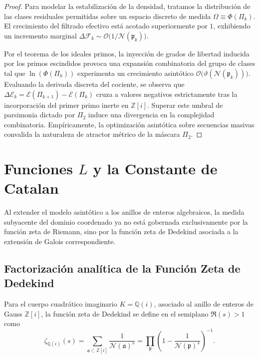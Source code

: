 \documentclass{article}
\numberwithin{equation}{section}
\theoremstyle{plain}
\theoremstyle{definition}
\begin{document}
\begin{proof}
Para modelar la estabilización de la densidad, tratamos la distribución de las clases residuales permitidas sobre un espacio discreto de medida $\Omega \equiv \Phi(\Pi_k)$. El crecimiento del filtrado efectivo está acotado superiormente por $1$, exhibiendo un incremento marginal $\Delta\mathcal{F}_k \sim \mathcal{O}\big(1/\mathcal{N}(\mathfrak{p}_k)\big)$.

Por el teorema de los ideales primos, la inyección de grados de libertad inducida por los primos escindidos provoca una expansión combinatoria del grupo de clases tal que $\ln(\Phi(\Pi_k))$ experimenta un crecimiento asintótico $\mathcal{O}\big(\vartheta(\mathcal{N}(\mathfrak{p}_k))\big)$. Evaluando la derivada discreta del cociente, se observa que $\Delta\mathcal{E}_k = \mathcal{E}(\Pi_{k+1}) - \mathcal{E}(\Pi_k)$ cruza a valores negativos estrictamente tras la incorporación del primer primo inerte en $\mathbb{Z}[i]$. Superar este umbral de parsimonia dictado por $\Pi_2$ induce una divergencia en la complejidad combinatoria. Empíricamente, la optimización asintótica sobre secuencias masivas convalida la naturaleza de atractor métrico de la máscara $\Pi_2$.
\end{proof}

\section{Funciones \texorpdfstring{$L$}{L} y la Constante de Catalan}
\label{sec:funciones_L}

Al extender el modelo asintótico a los anillos de enteros algebraicos, la medida subyacente del dominio coordenado ya no está gobernada exclusivamente por la función zeta de Riemann, sino por la función zeta de Dedekind asociada a la extensión de Galois correspondiente.

\subsection{Factorización analítica de la Función Zeta de Dedekind}

Para el cuerpo cuadrático imaginario $K = \mathbb{Q}(i)$, asociado al anillo de enteros de Gauss $\mathbb{Z}[i]$, la función zeta de Dedekind se define en el semiplano $\Re(s) > 1$ como
\begin{equation}
    \zeta_{\mathbb{Q}(i)}(s) = \sum_{\mathfrak{a} \subset \mathbb{Z}[i]} \frac{1}{\mathcal{N}(\mathfrak{a})^s} = \prod_{\mathfrak{p}} \left( 1 - \frac{1}{\mathcal{N}(\mathfrak{p})^s} \right)^{-1}.
\end{equation}
\end{document}
